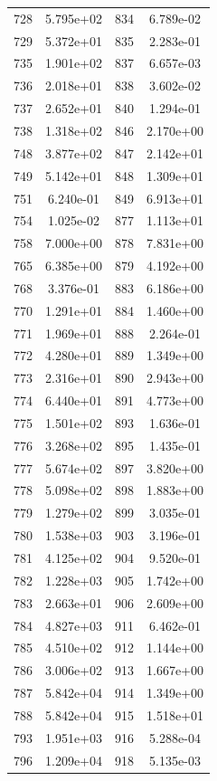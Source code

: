 \documentclass[12pt]{article}
\begin{document}
\begin{longtable}{@{}cccc@{}}
728 & 5.795e+02 & 834 & 6.789e-02 \\
729 & 5.372e+01 & 835 & 2.283e-01 \\
735 & 1.901e+02 & 837 & 6.657e-03 \\
736 & 2.018e+01 & 838 & 3.602e-02 \\
737 & 2.652e+01 & 840 & 1.294e-01 \\
738 & 1.318e+02 & 846 & 2.170e+00 \\
748 & 3.877e+02 & 847 & 2.142e+01 \\
749 & 5.142e+01 & 848 & 1.309e+01 \\
751 & 6.240e-01 & 849 & 6.913e+01 \\
754 & 1.025e-02 & 877 & 1.113e+01 \\
758 & 7.000e+00 & 878 & 7.831e+00 \\
765 & 6.385e+00 & 879 & 4.192e+00 \\
768 & 3.376e-01 & 883 & 6.186e+00 \\
770 & 1.291e+01 & 884 & 1.460e+00 \\
771 & 1.969e+01 & 888 & 2.264e-01 \\
772 & 4.280e+01 & 889 & 1.349e+00 \\
773 & 2.316e+01 & 890 & 2.943e+00 \\
774 & 6.440e+01 & 891 & 4.773e+00 \\
775 & 1.501e+02 & 893 & 1.636e-01 \\
776 & 3.268e+02 & 895 & 1.435e-01 \\
777 & 5.674e+02 & 897 & 3.820e+00 \\
778 & 5.098e+02 & 898 & 1.883e+00 \\
779 & 1.279e+02 & 899 & 3.035e-01 \\
780 & 1.538e+03 & 903 & 3.196e-01 \\
781 & 4.125e+02 & 904 & 9.520e-01 \\
782 & 1.228e+03 & 905 & 1.742e+00 \\
783 & 2.663e+01 & 906 & 2.609e+00 \\
784 & 4.827e+03 & 911 & 6.462e-01 \\
785 & 4.510e+02 & 912 & 1.144e+00 \\
786 & 3.006e+02 & 913 & 1.667e+00 \\
787 & 5.842e+04 & 914 & 1.349e+00 \\
788 & 5.842e+04 & 915 & 1.518e+01 \\
793 & 1.951e+03 & 916 & 5.288e-04 \\
796 & 1.209e+04 & 918 & 5.135e-03 \\

\end{longtable}
\end{document}
